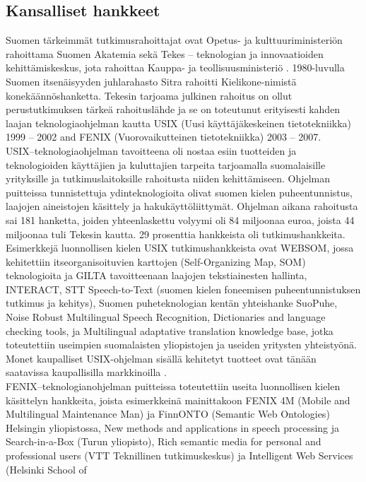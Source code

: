 \begin{multicols}{2}
\subsection{Kansalliset hankkeet}


Suomen tärkeimmät tutkimusrahoittajat ovat Opetus- ja
kulttuuriministeriön rahoittama Suomen Akatemia sekä Tekes –
teknologian ja innovaatioiden kehittämiskeskus, jota rahoittaa Kauppa-
ja teollisuusministeriö \cite{Leading}. 1980-luvulla Suomen
itsenäisyyden juhlarahasto Sitra rahoitti Kielikone-nimistä
konekäännöshanketta. Tekesin tarjoama julkinen rahoitus on ollut
perustutkimuksen tärkeä rahoituslähde ja se on toteutunut erityisesti
kahden laajan teknologiaohjelman kautta USIX (Uusi käyttäjäkeskeinen
tietotekniikka) 1999 – 2002 and FENIX (Vuorovaikutteinen
tietotekniikka) 2003 – 2007.\\
USIX–teknologiaohjelman tavoitteena oli nostaa esiin tuotteiden ja
teknologioiden käyttäjien ja kuluttajien tarpeita tarjoamalla
suomalaisille yrityksille ja tutkimuslaitoksille rahoitusta niiden
kehittämiseen. Ohjelman puitteissa tunnistettuja ydinteknologioita
olivat suomen kielen puheentunnistus, laajojen aineistojen käsittely
ja hakukäyttöliittymät. Ohjelman aikana rahoitusta sai 181 hanketta,
joiden yhteenlaskettu volyymi oli 84 miljoonaa euroa, joista 44
miljoonaa tuli Tekesin kautta. 29 prosenttia hankkeista oli
tutkimushankkeita. Esimerkkejä luonnollisen kielen USIX
tutkimushankkeista ovat WEBSOM, jossa kehitettiin itseorganisoituvien
karttojen (Self-Organizing Map, SOM) teknologioita ja GILTA
tavoitteenaan laajojen tekstiainesten hallinta, INTERACT, STT
Speech-to-Text (suomen kielen foneemisen puheentunnistuksen tutkimus
ja kehitys), Suomen puheteknologian kentän yhteishanke SuoPuhe, Noise
Robust Multilingual Speech Recognition, Dictionaries and language
checking tools, ja Multilingual adaptative translation knowledge base,
jotka toteutettiin useimpien suomalaisten yliopistojen ja useiden
yritysten yhteistyönä. Monet kaupalliset USIX-ohjelman sisällä
kehitetyt tuotteet ovat tänään saatavissa kaupallisilla
markkinoilla \cite{LoppuUSIX}.\\
FENIX–teknologianohjelman puitteissa toteutettiin useita luonnollisen
kielen käsittelyn hankkeita, joista esimerkkeinä mainittakoon FENIX 4M
(Mobile and Multilingual Maintenance Man) ja FinnONTO (Semantic Web
Ontologies) Helsingin yliopistossa, New methods and applications in
speech processing ja Search-in-a-Box (Turun yliopisto), Rich semantic
media for personal and professional users (VTT Teknillinen
tutkimuskeskus) ja Intelligent Web Services (Helsinki School of

\end{multicols}
